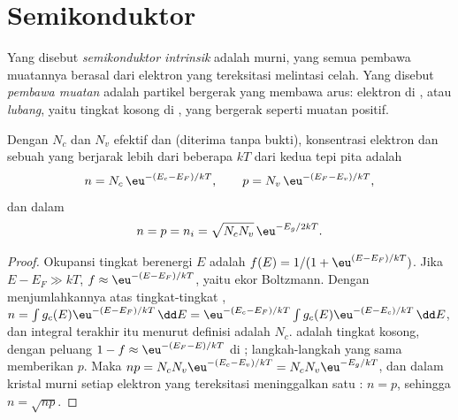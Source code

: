\section{Semikonduktor}

\begin{definition}\label{def:b3:solid-state:carriers}
Yang disebut \emph{semikonduktor intrinsik} adalah 
murni, yang semua pembawa muatannya berasal dari elektron yang tereksitasi melintasi celah. Yang disebut
\emph{pembawa muatan} adalah partikel bergerak yang membawa
arus: elektron di , atau \emph{lubang}, yaitu
tingkat kosong di , yang bergerak seperti muatan positif.
\end{definition}

\begin{theorem}\label{thm:b3:solid-state:intrinsic}
Dengan $N_c$ dan $N_v$  efektif  dan  (diterima tanpa bukti), konsentrasi elektron dan  sebuah 
yang  berjarak lebih dari beberapa $kT$ dari kedua tepi pita adalah
\[
  n = N_c\,\eu^{-(E_c - E_F)/kT}, \qquad p = N_v\,\eu^{-(E_F - E_v)/kT},
\]
dan dalam 
\[
  n = p = n_i = \sqrt{N_cN_v}\,\eu^{-E_g/2kT}.
\]
\end{theorem}

\begin{proof}
Okupansi tingkat berenergi $E$ adalah $f(E) = 1/(1 + \eu^{(E - E_F)/kT})$. Jika
$E - E_F \gg kT$, $f \approx \eu^{-(E - E_F)/kT}$, yaitu ekor Boltzmann. Dengan menjumlahkannya atas tingkat-tingkat , $n = \int g_c(E)\eu^{-(E - E_F)/kT}\,\dd E = \eu^{-(E_c - E_F)/kT}\int g_c(E)\eu^{-(E - E_c)/kT}\,\dd E$, dan integral terakhir itu menurut
definisi adalah $N_c$.  adalah tingkat kosong, dengan peluang $1 - f \approx \eu^{-(E_F - E)/kT}$ di
; langkah-langkah yang sama memberikan $p$. Maka $np = N_cN_v\eu^{-(E_c - E_v)/kT} = N_cN_v\eu^{-E_g/kT}$, dan dalam kristal murni
setiap elektron yang tereksitasi meninggalkan satu : $n = p$, sehingga $n = \sqrt{np}$.
\end{proof}

